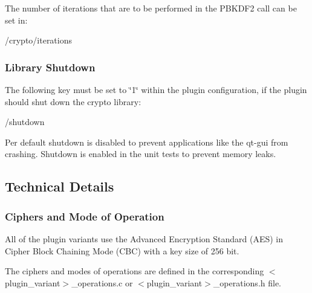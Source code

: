 The number of iterations that are to be performed in the P\+B\+K\+D\+F2 call can be set in\+:


\begin{DoxyCode}
/crypto/iterations
\end{DoxyCode}


\subsubsection*{Library Shutdown}

The following key must be set to {\ttfamily \char`\"{}1\char`\"{}} within the plugin configuration, if the plugin should shut down the crypto library\+:


\begin{DoxyCode}
/shutdown
\end{DoxyCode}


Per default shutdown is disabled to prevent applications like the qt-\/gui from crashing. Shutdown is enabled in the unit tests to prevent memory leaks.

\subsection*{Technical Details}

\subsubsection*{Ciphers and Mode of Operation}

All of the plugin variants use the Advanced Encryption Standard (A\+ES) in Cipher Block Chaining Mode (C\+BC) with a key size of 256 bit.

The ciphers and modes of operations are defined in the corresponding {\ttfamily $<$plugin\+\_\+variant$>$\+\_\+operations.\+c} or {\ttfamily $<$plugin\+\_\+variant$>$\+\_\+operations.\+h} file. 